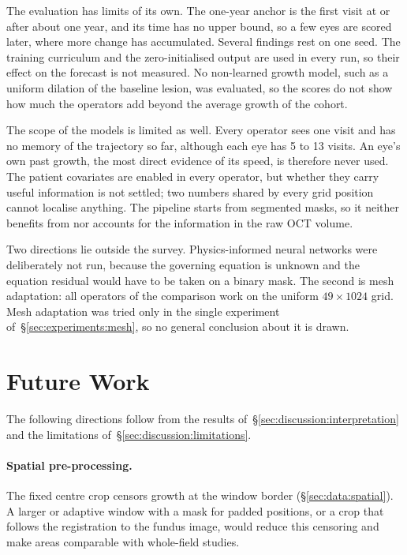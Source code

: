 The evaluation has limits of its own. The one-year anchor is the first
visit at or after about one year, and its time
has no upper bound, so a few eyes are scored later, where more change has
accumulated. Several findings rest on one
seed. The training curriculum and the zero-initialised output are used in
every run, so their effect on the forecast is not measured. No
non-learned growth model, such as a uniform dilation of the baseline
lesion, was evaluated, so the scores do not show how much the operators
add beyond the average growth of the cohort.

The scope of the models is limited as well. Every operator sees one visit
and has no memory of the trajectory so far,
although each eye has 5 to 13 visits. An eye's own past growth, the most
direct evidence of its speed, is therefore never used. The patient
covariates are enabled in every operator, but whether they carry useful
information is not settled; two numbers shared by every grid position
cannot localise anything. The pipeline starts from segmented masks, so
it neither benefits from nor accounts for the information in the raw OCT
volume.

Two directions lie outside the survey. Physics-informed neural networks
were deliberately not run, because the governing equation is unknown and
the equation residual would have to be taken on a binary mask. The second
is mesh adaptation: all operators of the comparison work on the uniform
$49 \times 1024$ grid. Mesh adaptation was tried only in the single
experiment of~\S\ref{sec:experiments:mesh}, so no general conclusion about
it is drawn.



\section{Future Work}
\label{sec:discussion:future}

The following directions follow from the results
of~\S\ref{sec:discussion:interpretation} and the limitations
of~\S\ref{sec:discussion:limitations}.

\paragraph{Spatial pre-processing.}
The fixed centre crop censors growth at the window border
(\S\ref{sec:data:spatial}). A larger or adaptive window with a mask for padded positions, or
a crop that follows the registration to the fundus image, would reduce
this censoring and make areas comparable with whole-field studies.

